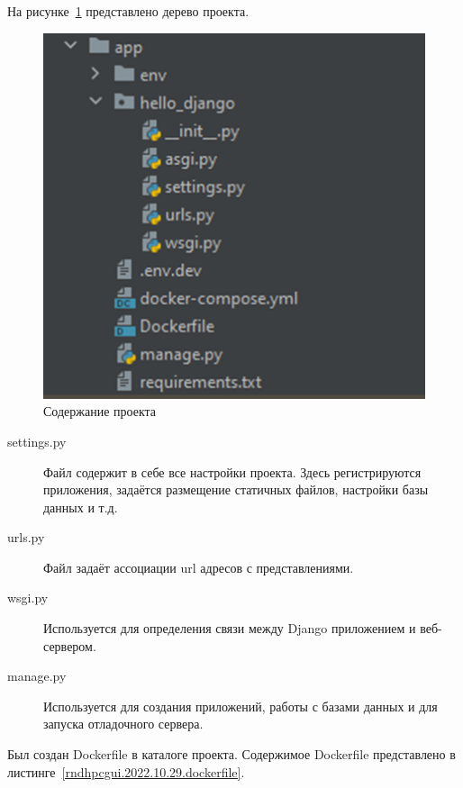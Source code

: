 \def\notedate{2022.10.29}
\def\currentauthor{Василян А.Р. (РК6-73Б)}

На рисунке~\ref{rndhpcgui.2022.10.29.picture1} представлено дерево проекта.
\begin{figure}[!ht]
  \centering
  \includegraphics[scale=0.8]{ResearchNotes/rndhpc_dev_gui_2022_10_29/picture1.png}
  \caption{Содержание проекта}
  \label{rndhpcgui.2022.10.29.picture1}
\end{figure}

\begin{description}
	\item[\textsf{settings.py}] Файл содержит в себе все настройки проекта. Здесь регистрируются приложения, задаётся размещение статичных файлов, настройки базы данных и т.д. 
	\item[\textsf{urls.py}] Файл задаёт ассоциации url адресов с представлениями. 
	\item[\textsf{wsgi.py}] Используется для определения связи между Django приложением и веб-сервером.
	\item[\textsf{manage.py}] Используется для создания приложений, работы с базами данных и для запуска отладочного сервера.
\end{description}

Был создан \textsf{Dockerfile} в каталоге проекта. Содержимое \textsf{Dockerfile} представлено в листинге~\ref{rndhpcgui.2022.10.29.dockerfile}.

